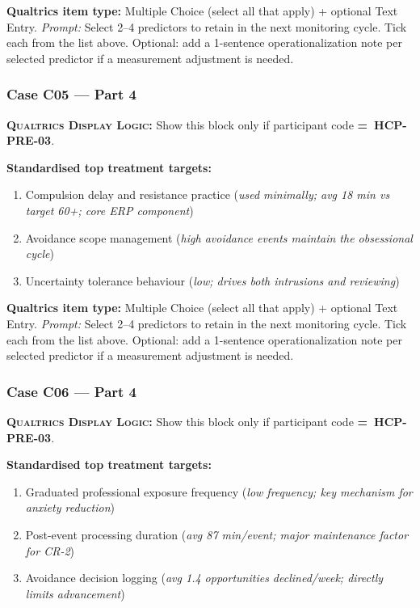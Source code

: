 \documentclass[11pt,a4paper]{article}
\newcommand{\checkboxresponse}[1]{\begin{tcolorbox}[colback=ResponseBG,colframe=GoldAmber,boxrule=0.6pt,arc=1.5mm,left=6pt,right=6pt,top=5pt,bottom=5pt]\small\textbf{\color{GoldAmber}Qualtrics item type:} Multiple Choice (select all that apply) + optional Text Entry. \quad \textit{Prompt:} #1\end{tcolorbox}}
\newcommand{\dlnote}[1]{\par\vspace{0.15em}\noindent\begin{tcolorbox}[colback=AccentAmber,colframe=GoldAmber,boxrule=0.45pt,arc=1mm,left=5pt,right=5pt,top=2.5pt,bottom=2.5pt]\footnotesize\textbf{\color{GoldAmber}\scshape Qualtrics Display Logic:} Show this block only if participant code \textbf{=~#1}.\end{tcolorbox}\vspace{0.1em}}
\begin{document}
\checkboxresponse{Select 2--4 predictors to retain in the next monitoring cycle. Tick each from the list above. Optional: add a 1-sentence operationalization note per selected predictor if a measurement adjustment is needed.}

\vspace{0.4em}

\subsubsection*{Case C05 --- Part 4}
\dlnote{HCP-PRE-03}

\begin{contextbox}
\small\textbf{Standardised top treatment targets:}
\begin{enumerate}[topsep=2pt,itemsep=1pt,label=\arabic*.]
\item Compulsion delay and resistance practice (\textit{used minimally; avg 18 min vs target 60+; core ERP component})
\item Avoidance scope management (\textit{high avoidance events maintain the obsessional cycle})
\item Uncertainty tolerance behaviour (\textit{low; drives both intrusions and reviewing})
\end{enumerate}
\end{contextbox}

\checkboxresponse{Select 2--4 predictors to retain in the next monitoring cycle. Tick each from the list above. Optional: add a 1-sentence operationalization note per selected predictor if a measurement adjustment is needed.}

\vspace{0.4em}

\subsubsection*{Case C06 --- Part 4}
\dlnote{HCP-PRE-03}

\begin{contextbox}
\small\textbf{Standardised top treatment targets:}
\begin{enumerate}[topsep=2pt,itemsep=1pt,label=\arabic*.]
\item Graduated professional exposure frequency (\textit{low frequency; key mechanism for anxiety reduction})
\item Post-event processing duration (\textit{avg 87 min/event; major maintenance factor for CR-2})
\item Avoidance decision logging (\textit{avg 1.4 opportunities declined/week; directly limits advancement})
\end{enumerate}
\end{contextbox}
\end{document}

